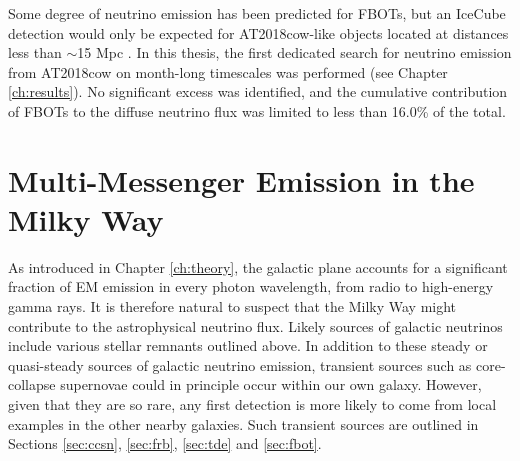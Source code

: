 Some degree of neutrino emission has been predicted for FBOTs, but an IceCube detection would only be expected for AT2018cow-like objects located at distances less than $\sim$15 Mpc . In this thesis, the first dedicated search for neutrino emission from AT2018cow on month-long timescales was performed (see Chapter \ref{ch:results}). No significant excess was identified, and the cumulative contribution of FBOTs to the diffuse neutrino flux was limited to less than 16.0\% of the total.

\section{Multi-Messenger Emission in the Milky Way}

As introduced in Chapter \ref{ch:theory}, the galactic plane accounts for a significant fraction of EM emission in every photon wavelength, from radio to high-energy gamma rays. It is therefore natural to suspect that the Milky Way might contribute to the astrophysical neutrino flux. Likely sources of galactic neutrinos include various stellar remnants outlined above. In addition to these steady or quasi-steady sources of galactic neutrino emission, transient sources such as core-collapse supernovae could in principle occur within our own galaxy. However, given that they are so rare, any first detection is more likely to come from local examples in the other nearby galaxies. Such transient sources are outlined in Sections \ref{sec:ccsn}, \ref{sec:frb}, \ref{sec:tde} and \ref{sec:fbot}. 

